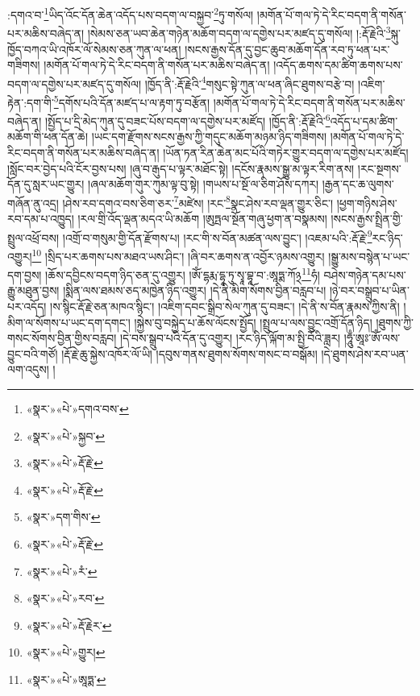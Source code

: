 :དགའ་བ་\footnote{«སྣར་»«པེ་»དགའ་བས་}ཡིད་འོང་དོན་ཆེན་འདོད་པས་བདག་ལ་བསྐྱབ་\footnote{«སྣར་»«པེ་»སྐྱབ་}ཏུ་གསོལ། །མགོན་པོ་གལ་ཏེ་དེ་རིང་བདག་ནི་གསོན་པར་མཆིས་བཞེད་ན། །སེམས་ཅན་ཡབ་ཆེན་གཉེན་མཆོག་བདག་ལ་དགྱེས་པར་མཛད་དུ་གསོལ། །:རྡོ་རྗེའི་\footnote{«སྣར་»«པེ་»རྡོ་རྗེ་}སྐུ་ཁྱོད་བཀའ་ཡི་འཁོར་ལོ་སེམས་ཅན་ཀུན་ལ་ཕན། །སངས་རྒྱས་དོན་དུ་བྱང་ཆུབ་མཆོག་དོན་རབ་ཏུ་ཕན་པར་གཟིགས། །མགོན་པོ་གལ་ཏེ་དེ་རིང་བདག་ནི་གསོན་པར་མཆིས་བཞེད་ན། །འདོད་ཆགས་དམ་ཚིག་ཆགས་པས་བདག་ལ་དགྱེས་པར་མཛད་དུ་གསོལ། །ཁྱོད་ནི་:རྡོ་རྗེའི་\footnote{«སྣར་»«པེ་»རྡོ་རྗེ་}གསུང་སྟེ་ཀུན་ལ་ཕན་ཞིང་ཐུགས་བརྩེ་བ། །འཇིག་རྟེན་:དག་གི་\footnote{«སྣར་»དག་གིས་}དགོས་པའི་དོན་མཛད་པ་ལ་རྟག་ཏུ་བརྩོན། །མགོན་པོ་གལ་ཏེ་དེ་རིང་བདག་ནི་གསོན་པར་མཆིས་བཞེད་ན། །སྤྱོད་པ་དྲི་མེད་ཀུན་དུ་བཟང་པོས་བདག་ལ་དགྱེས་པར་མཛོད། །ཁྱོད་ནི་:རྡོ་རྗེའི་\footnote{«སྣར་»«པེ་»རྡོ་རྗེ་}འདོད་པ་དམ་ཚིག་མཆོག་གི་ཕན་དོན་ཆེ། །ཡང་དག་རྫོགས་སངས་རྒྱས་ཀྱི་གདུང་མཆོག་མཉམ་ཉིད་གཟིགས། །མགོན་པོ་གལ་ཏེ་དེ་རིང་བདག་ནི་གསོན་པར་མཆིས་བཞེད་ན། །ཡོན་ཏན་རིན་ཆེན་མང་པོའི་གཏེར་གྱུར་བདག་ལ་དགྱེས་པར་མཛོད། །སློང་བར་བྱེད་པའི་ངོར་བྱས་པས། །ཞུ་བ་རྒུད་པ་ལྟར་མཐོང་སྟེ། །དངོས་རྣམས་སྒྱུ་མ་ལྟར་རིག་ནས། །རང་སྔགས་དོན་དུ་སླར་ཡང་གྱུར། །ཞལ་མཆོག་གུར་ཀུམ་ལྟ་བུ་སྟེ། །གཡས་པ་སྔོ་ལ་ཅིག་ཤོས་དཀར། །རྒྱན་དང་ཆ་ལུགས་གཞོན་ནུ་འདྲ། །ཤེས་རབ་དགའ་བས་ཅིག་ཅར་\footnote{«སྣར་»«པེ་»རཾ་}མཛེས། །རང་\footnote{«སྣར་»«པེ་»རབ་}སྣང་ཤེས་རབ་ལྡན་གྱུར་ཅིང་། །ཕྱག་གཉིས་ཤེས་རབ་དམ་པ་འཁྱུད། །རལ་གྲི་འོད་ལྡན་མདའ་ཡི་མཆོག །ཨུཏྤལ་སྔོན་གཞུ་ཕྱག་ན་བསྣམས། །སངས་རྒྱས་སྤྲིན་གྱི་སྤྲུལ་འཕྲོ་བས། །འགྲོ་བ་གསུམ་གྱི་དོན་རྫོགས་པ། །རང་གི་ས་བོན་མཚན་ལས་བྱུང་། །འཇམ་པའི་:རྡོ་རྗེ་\footnote{«སྣར་»«པེ་»རྡོ་རྗེར་}རང་ཉིད་འགྱུར།\footnote{«སྣར་»«པེ་»གྱུར།} །སྲིད་པར་ཆགས་པས་མཐའ་ཡས་ཤིང་། །ཞི་བར་ཆགས་ན་འབྱོར་ཉམས་འགྱུར། །སྒྱུ་མས་བསྙེན་པ་ཡང་དག་བྱས། །ཆོས་དབྱིངས་བདག་ཉིད་ཅན་དུ་འགྱུར། །ཨོཾ་དྷརྨ་དྷཱ་ཏུ་སྭཱ་བྷཱ་བ་:ཨཱཏྨ་ཀོ྅\footnote{«སྣར་»«པེ་»ཨཱཏྨ་}ཧཾ། བཤེས་གཉེན་དམ་པས་རྒྱུ་མཐུན་བྱས། །སྨིན་ལས་ཐམས་ཅད་མཁྱེན་ཉིད་འགྱུར། །དེ་ནི་མིག་སོགས་བྱིན་བརླབ་པ། །ཉེ་བར་བསྒྲུབ་པ་ཡིན་པར་འདོད། །ས་སྙིང་རྡོ་རྗེ་ཅན་མཁའ་སྙིང་། །འཇིག་དབང་སྒྲིབ་སེལ་ཀུན་དུ་བཟང་། །དེ་ནི་ས་བོན་རྣམས་ཀྱིས་ནི། །མིག་ལ་སོགས་པ་ཡང་དག་དགང་། །སྐྱེས་བུ་བསྐྱེད་པ་ཆོས་ལོངས་སྤྱོད། །སྤྲུལ་པ་ལས་བྱུང་འགྲོ་དོན་ཉིད། །ཐུགས་ཀྱི་གསང་སོགས་བྱིན་གྱིས་བརླབ། །དེ་བས་སྒྲུབ་པའི་དོན་དུ་འགྱུར། །རང་ཉིད་ལྐོག་མ་སྤྱི་བོའི་ཟླར། །ཧཱུྃ་ཨཱཿ་ཨོཾ་ལས་བྱུང་བའི་གཙོ། །རྡོ་རྗེ་ཆུ་སྐྱེས་འཁོར་ལོ་ཡི། །དབུས་གནས་ཐུགས་སོགས་གསང་བ་བསྒོམ། །དེ་ཐུགས་ཤེས་རབ་ཡན་ལག་འདུས། །
